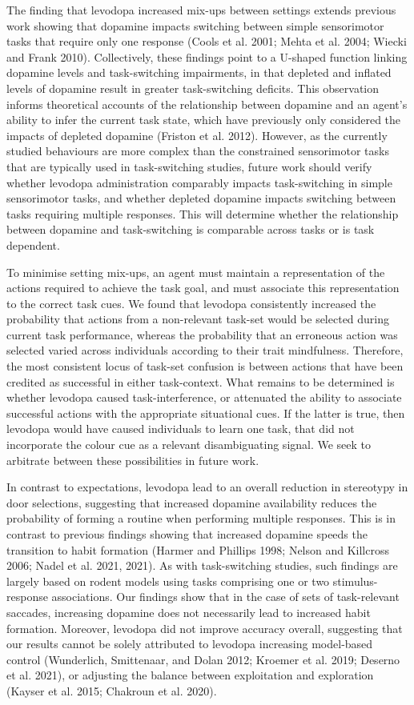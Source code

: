 \documentclass{article}
\begin{document}
The finding that levodopa increased mix-ups between settings extends
previous work showing that dopamine impacts switching between simple
sensorimotor tasks that require only one response (Cools et al. 2001;
Mehta et al. 2004; Wiecki and Frank 2010). Collectively, these findings
point to a U-shaped function linking dopamine levels and task-switching
impairments, in that depleted and inflated levels of dopamine result in
greater task-switching deficits. This observation informs theoretical
accounts of the relationship between dopamine and an agent's ability to
infer the current task state, which have previously only considered the
impacts of depleted dopamine (Friston et al. 2012). However, as the
currently studied behaviours are more complex than the constrained
sensorimotor tasks that are typically used in task-switching studies,
future work should verify whether levodopa administration comparably
impacts task-switching in simple sensorimotor tasks, and whether
depleted dopamine impacts switching between tasks requiring multiple
responses. This will determine whether the relationship between dopamine
and task-switching is comparable across tasks or is task dependent.

To minimise setting mix-ups, an agent must maintain a representation of
the actions required to achieve the task goal, and must associate this
representation to the correct task cues. We found that levodopa
consistently increased the probability that actions from a non-relevant
task-set would be selected during current task performance, whereas the
probability that an erroneous action was selected varied across
individuals according to their trait mindfulness. Therefore, the most
consistent locus of task-set confusion is between actions that have been
credited as successful in either task-context. What remains to be
determined is whether levodopa caused task-interference, or attenuated
the ability to associate successful actions with the appropriate
situational cues. If the latter is true, then levodopa would have caused
individuals to learn one task, that did not incorporate the colour cue
as a relevant disambiguating signal. We seek to arbitrate between these
possibilities in future work.

In contrast to expectations, levodopa lead to an overall reduction in
stereotypy in door selections, suggesting that increased dopamine
availability reduces the probability of forming a routine when
performing multiple responses. This is in contrast to previous findings
showing that increased dopamine speeds the transition to habit formation
(Harmer and Phillips 1998; Nelson and Killcross 2006; Nadel et al. 2021,
2021). As with task-switching studies, such findings are largely based
on rodent models using tasks comprising one or two stimulus-response
associations. Our findings show that in the case of sets of
task-relevant saccades, increasing dopamine does not necessarily lead to
increased habit formation. Moreover, levodopa did not improve accuracy
overall, suggesting that our results cannot be solely attributed to
levodopa increasing model-based control (Wunderlich, Smittenaar, and
Dolan 2012; Kroemer et al. 2019; Deserno et al. 2021), or adjusting the
balance between exploitation and exploration (Kayser et al. 2015;
Chakroun et al. 2020).
\end{document}
